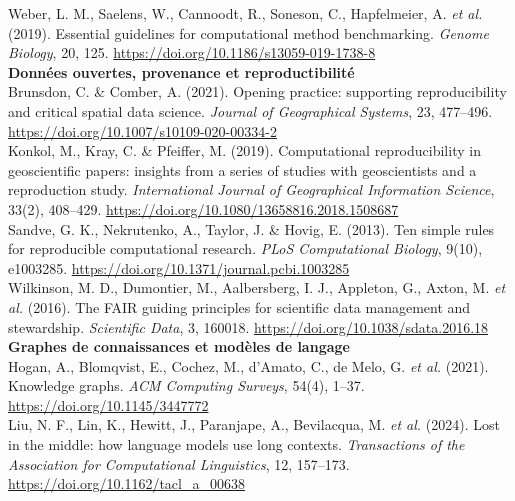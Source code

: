\documentclass[11pt,a4paper]{article}
\begin{document}
{Weber, L. M., Saelens, W., Cannoodt, R., Soneson, C., Hapfelmeier, A. \textit{et al.} (2019). Essential guidelines for computational method benchmarking. \textit{Genome Biology}, 20, 125. \url{https://doi.org/10.1186/s13059-019-1738-8}\\[0.4cm]

\textbf{Données ouvertes, provenance et reproductibilité}\\[0.15cm]

Brunsdon, C. \& Comber, A. (2021). Opening practice: supporting reproducibility and critical spatial data science. \textit{Journal of Geographical Systems}, 23, 477--496. \url{https://doi.org/10.1007/s10109-020-00334-2}\\[0.2cm]

Konkol, M., Kray, C. \& Pfeiffer, M. (2019). Computational reproducibility in geoscientific papers: insights from a series of studies with geoscientists and a reproduction study. \textit{International Journal of Geographical Information Science}, 33(2), 408--429. \url{https://doi.org/10.1080/13658816.2018.1508687}\\[0.2cm]

Sandve, G. K., Nekrutenko, A., Taylor, J. \& Hovig, E. (2013). Ten simple rules for reproducible computational research. \textit{PLoS Computational Biology}, 9(10), e1003285. \url{https://doi.org/10.1371/journal.pcbi.1003285}\\[0.2cm]

Wilkinson, M. D., Dumontier, M., Aalbersberg, I. J., Appleton, G., Axton, M. \textit{et al.} (2016). The FAIR guiding principles for scientific data management and stewardship. \textit{Scientific Data}, 3, 160018. \url{https://doi.org/10.1038/sdata.2016.18}\\[0.4cm]

\textbf{Graphes de connaissances et modèles de langage}\\[0.15cm]

Hogan, A., Blomqvist, E., Cochez, M., d'Amato, C., de Melo, G. \textit{et al.} (2021). Knowledge graphs. \textit{ACM Computing Surveys}, 54(4), 1--37. \url{https://doi.org/10.1145/3447772}\\[0.2cm]

Liu, N. F., Lin, K., Hewitt, J., Paranjape, A., Bevilacqua, M. \textit{et al.} (2024). Lost in the middle: how language models use long contexts. \textit{Transactions of the Association for Computational Linguistics}, 12, 157--173. \url{https://doi.org/10.1162/tacl_a_00638}\\[0.2cm]

}
\end{document}
